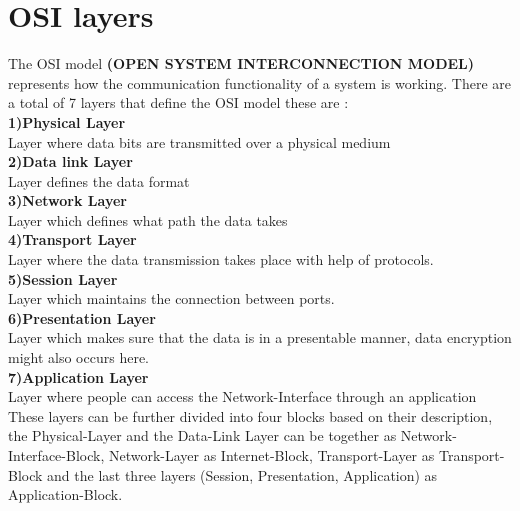 \documentclass{article}
\begin{document}
\section{OSI layers}
\begin{flushleft}

The OSI model \textbf{(OPEN SYSTEM INTERCONNECTION MODEL)} represents how the communication functionality of a system is working. There  are a total of  7 layers
that define the OSI model these are :  \\
\vspace{0.15cm}
\textbf{1)Physical Layer} \\
 Layer where data bits are transmitted over a physical medium\\
\vspace{0.15cm}
\textbf{2)Data link Layer}\\
Layer defines the data format\\
\vspace{0.15cm}
\textbf{3)Network Layer}  \\
Layer which defines what path the data takes\\
\vspace{0.15cm}
\textbf{4)Transport Layer} \\
Layer where the data transmission takes place with help of protocols. \\
\vspace{0.15cm}
\textbf{5)Session Layer} \\
Layer which maintains the connection between ports. \\
\vspace{0.15cm}
\textbf{6)Presentation Layer} \\
Layer which makes sure that the data is in a presentable manner, data encryption might also occurs here. \\
\vspace{0.15cm}
\textbf{7)Application Layer} \\
Layer where people can access the Network-Interface through an application \\ 
\vspace{0.5cm}
These layers can be further divided into four blocks based on their description, the Physical-Layer and the Data-Link Layer can be together  as Network-Interface-Block, Network-Layer as Internet-Block, Transport-Layer as Transport-Block and the last three layers (Session, Presentation, Application) as Application-Block.

\vspace{1cm}

\end{flushleft}
\end{document}
